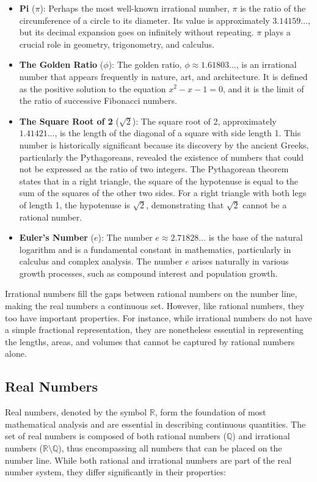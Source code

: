 \begin{itemize}
    \item \textbf{Pi} ($\pi$): Perhaps the most well-known irrational number, $\pi$ is the ratio of the circumference of a circle to its diameter. Its value is approximately $3.14159\ldots$, but its decimal expansion goes on infinitely without repeating. $\pi$ plays a crucial role in geometry, trigonometry, and calculus.

    \item \textbf{The Golden Ratio} ($\phi$): The golden ratio, $\phi \approx 1.61803\ldots$, is an irrational number that appears frequently in nature, art, and architecture. It is defined as the positive solution to the equation $x^2 - x - 1 = 0$, and it is the limit of the ratio of successive Fibonacci numbers.

    \item \textbf{The Square Root of 2} ($\sqrt{2}$): The square root of 2, approximately $1.41421\ldots$, is the length of the diagonal of a square with side length 1. This number is historically significant because its discovery by the ancient Greeks, particularly the Pythagoreans, revealed the existence of numbers that could not be expressed as the ratio of two integers. The Pythagorean theorem states that in a right triangle, the square of the hypotenuse is equal to the sum of the squares of the other two sides. For a right triangle with both legs of length 1, the hypotenuse is $\sqrt{2}$, demonstrating that $\sqrt{2}$ cannot be a rational number.

    \item \textbf{Euler's Number} ($e$): The number $e \approx 2.71828\ldots$ is the base of the natural logarithm and is a fundamental constant in mathematics, particularly in calculus and complex analysis. The number $e$ arises naturally in various growth processes, such as compound interest and population growth.
\end{itemize}

Irrational numbers fill the gaps between rational numbers on the number line, making the real numbers a continuous set. However, like rational numbers, they too have important properties. For instance, while irrational numbers do not have a simple fractional representation, they are nonetheless essential in representing the lengths, areas, and volumes that cannot be captured by rational numbers alone.

\subsection*{Real Numbers}
Real numbers, denoted by the symbol $\mathbb{R}$, form the foundation of most mathematical analysis and are essential in describing continuous quantities. The set of real numbers is composed of both rational numbers ($\mathbb{Q}$) and irrational numbers ($\mathbb{R} \setminus \mathbb{Q}$), thus encompassing all numbers that can be placed on the number line. While both rational and irrational numbers are part of the real number system, they differ significantly in their properties:

